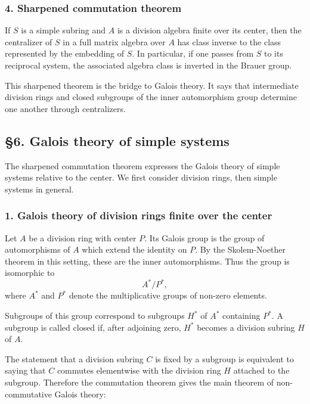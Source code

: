 \documentclass[11pt]{article}
\begin{document}
\subsubsection{4. Sharpened commutation
theorem}\label{sharpened-commutation-theorem}

If \(S\) is a simple subring and \(A\) is a division algebra finite over
its center, then the centralizer of \(S\) in a full matrix algebra over
\(A\) has class inverse to the class represented by the embedding of
\(S\). In particular, if one passes from \(S\) to its reciprocal system,
the associated algebra class is inverted in the Brauer group.

This sharpened theorem is the bridge to Galois theory. It says that
intermediate division rings and closed subgroups of the inner
automorphism group determine one another through centralizers.

\subsection{§6. Galois theory of simple
systems}\label{galois-theory-of-simple-systems}

The sharpened commutation theorem expresses the Galois theory of simple
systems relative to the center. We first consider division rings, then
simple systems in general.

\subsubsection{1. Galois theory of division rings finite over the
center}\label{galois-theory-of-division-rings-finite-over-the-center}

Let \(A\) be a division ring with center \(P\). Its Galois group is the
group of automorphisms of \(A\) which extend the identity on \(P\). By
the Skolem-Noether theorem in this setting, these are the inner
automorphisms. Thus the group is isomorphic to \[
  A^*/P^*,
\] where \(A^*\) and \(P^*\) denote the multiplicative groups of
non-zero elements.

Subgroups of this group correspond to subgroups \(H^*\) of \(A^*\)
containing \(P^*\). A subgroup is called closed if, after adjoining
zero, \(H^*\) becomes a division subring \(H\) of \(A\).

The statement that a division subring \(C\) is fixed by a subgroup is
equivalent to saying that \(C\) commutes elementwise with the division
ring \(H\) attached to the subgroup. Therefore the commutation theorem
gives the main theorem of non-commutative Galois theory:
\end{document}
